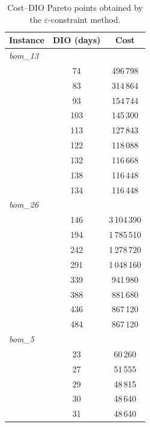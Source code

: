 \begin{table}[!htbp]\centering\small
\caption{Cost--DIO Pareto points obtained by the $\varepsilon$-constraint method.}\label{tab:paretodio}
\begin{tabular}{lcc}
\toprule
Instance & DIO (days) & Cost\\
\midrule
\multicolumn{3}{l}{\textit{bom\_13}} \\
 & 74 & 496\,798 \\
 & 83 & 314\,864 \\
 & 93 & 154\,744 \\
 & 103 & 145\,300 \\
 & 113 & 127\,843 \\
 & 122 & 118\,088 \\
 & 132 & 116\,668 \\
 & 138 & 116\,448 \\
 & 134 & 116\,448 \\
\midrule
\multicolumn{3}{l}{\textit{bom\_26}} \\
 & 146 & 3\,104\,390 \\
 & 194 & 1\,785\,510 \\
 & 242 & 1\,278\,720 \\
 & 291 & 1\,048\,160 \\
 & 339 & 941\,980 \\
 & 388 & 881\,680 \\
 & 436 & 867\,120 \\
 & 484 & 867\,120 \\
\midrule
\multicolumn{3}{l}{\textit{bom\_5}} \\
 & 23 & 60\,260 \\
 & 27 & 51\,555 \\
 & 29 & 48\,815 \\
 & 30 & 48\,640 \\
 & 31 & 48\,640 \\
\bottomrule
\end{tabular}
\end{table}
